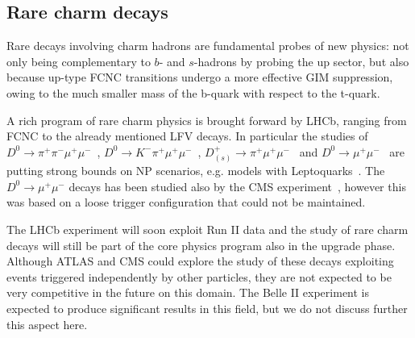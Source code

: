 \subsection{Rare charm decays}

Rare decays involving charm hadrons are fundamental probes of new physics: 
not only being complementary to $b$- and $s$-hadrons by probing the up sector, 
but also because up-type FCNC transitions undergo a more effective GIM suppression, owing to the much smaller mass of the b-quark with respect to the t-quark. 


A rich program of rare charm physics is brought forward by LHCb, ranging from FCNC to the already mentioned LFV decays. 
In particular the studies of $D^0\to \pi^+ \pi^- \mu^+\mu^-$~\cite{Aaij:2013uoa}, 
$D^0\to K^- \pi^+ \mu^+\mu^-$~\cite{Aaij:2015hva}, $D^+_{(s)}\to \pi^+ \mu^+\mu^-$~\cite{Aaij:2013sua} and $D^0\to \mu^+\mu^-$~\cite{Aaij:2013cza}
are putting strong bounds on NP scenarios, e.g. models with Leptoquarks~\cite{Bauer:2015knc}.
The $D^0 \to \mu^+ \mu^-$ decays has been studied also by the CMS experiment~\cite{Pedrini:2012vp}, however this was based on a loose trigger
configuration that could not be maintained.

The LHCb experiment will soon exploit Run II data and the study of rare charm decays will still be part of the core physics program
also in the upgrade phase. 
Although ATLAS and CMS could explore the study of these decays exploiting events triggered independently by other particles, they are not expected to be very competitive in the future on this domain. 
The Belle II experiment is expected to produce significant results in this field, but we do not discuss further this aspect here. 

